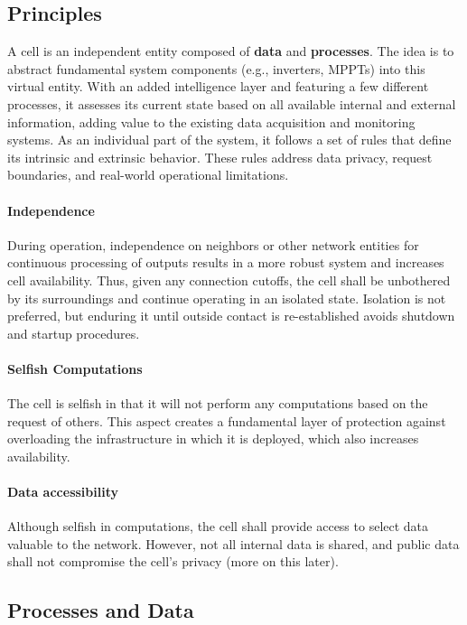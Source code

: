 \subsection{Principles}

A cell is an independent entity composed of \textbf{data} and \textbf{processes}. The idea is to abstract fundamental system components (e.g., inverters, MPPTs) into this virtual entity. With an added intelligence layer and featuring a few different processes, it assesses its current state based on all available internal and external information, adding value to the existing data acquisition and monitoring systems. As an individual part of the system, it follows a set of rules that define its intrinsic and extrinsic behavior. These rules address data privacy, request boundaries, and real-world operational limitations.

\paragraph*{Independence} During operation, independence on neighbors or other network entities for continuous processing of outputs results in a more robust system and increases cell availability. Thus, given any connection cutoffs, the cell shall be unbothered by its surroundings and continue operating in an isolated state. Isolation is not preferred, but enduring it until outside contact is re-established avoids shutdown and startup procedures.

\paragraph*{Selfish Computations} The cell is selfish in that it will not perform any computations based on the request of others. This aspect creates a fundamental layer of protection against overloading the infrastructure in which it is deployed, which also increases availability.

\paragraph*{Data accessibility} Although selfish in computations, the cell shall provide access to select data valuable to the network. However, not all internal data is shared, and public data shall not compromise the cell's privacy (more on this later).

\subsection{Processes and Data}


